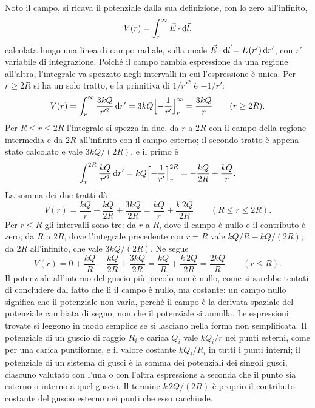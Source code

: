 \documentclass[11pt,a4paper]{article}
\begin{document}
Noto il campo, si ricava il potenziale dalla sua definizione, con lo zero all'infinito,
\[
V(r)=\int_r^{\infty}\vec{E}\cdot\mathrm{d}\vec{l} ,
\]
calcolata lungo una linea di campo radiale, sulla quale $\vec{E}\cdot\mathrm{d}\vec{l}=E(r')\,\mathrm{d} r'$, con $r'$ variabile di integrazione. Poiché il campo cambia espressione da una regione all'altra, l'integrale va spezzato negli intervalli in cui l'espressione è unica. Per $r\ge2R$ si ha un solo tratto, e la primitiva di $1/r'^2$ è $-1/r'$:
\[
V(r)=\int_r^{\infty}\frac{3kQ}{r'^2}\,\mathrm{d} r'=3kQ\Bigl[-\frac{1}{r'}\Bigr]_r^{\infty}=\frac{3kQ}{r}\qquad(r\ge2R).
\]
Per $R\le r\le2R$ l'integrale si spezza in due, da $r$ a $2R$ con il campo della regione intermedia e da $2R$ all'infinito con il campo esterno; il secondo tratto è appena stato calcolato e vale $3kQ/(2R)$, e il primo è
\[
\int_r^{2R}\frac{kQ}{r'^2}\,\mathrm{d} r'=kQ\Bigl[-\frac{1}{r'}\Bigr]_r^{2R}=-\frac{kQ}{2R}+\frac{kQ}{r} .
\]
La somma dei due tratti dà
\[
V(r)=\frac{kQ}{r}-\frac{kQ}{2R}+\frac{3kQ}{2R}=\frac{kQ}{r}+\frac{k\,2Q}{2R}\qquad(R\le r\le2R).
\]
Per $r\le R$ gli intervalli sono tre: da $r$ a $R$, dove il campo è nullo e il contributo è zero; da $R$ a $2R$, dove l'integrale precedente con $r=R$ vale $kQ/R-kQ/(2R)$; da $2R$ all'infinito, che vale $3kQ/(2R)$. Ne segue
\[
V(r)=0+\frac{kQ}{R}-\frac{kQ}{2R}+\frac{3kQ}{2R}=\frac{kQ}{R}+\frac{k\,2Q}{2R}=\frac{2kQ}{R}\qquad(r\le R).
\]
Il potenziale all'interno del guscio più piccolo non è nullo, come si sarebbe tentati di concludere dal fatto che lì il campo è nullo, ma costante: un campo nullo significa che il potenziale non varia, perché il campo è la derivata spaziale del potenziale cambiata di segno, non che il potenziale si annulla. Le espressioni trovate si leggono in modo semplice se si lasciano nella forma non semplificata. Il potenziale di un guscio di raggio $R_i$ e carica $Q_i$ vale $kQ_i/r$ nei punti esterni, come per una carica puntiforme, e il valore costante $kQ_i/R_i$ in tutti i punti interni; il potenziale di un sistema di gusci è la somma dei potenziali dei singoli gusci, ciascuno valutato con l'una o con l'altra espressione a seconda che il punto sia esterno o interno a quel guscio. Il termine $k\,2Q/(2R)$ è proprio il contributo costante del guscio esterno nei punti che esso racchiude.
\end{document}
